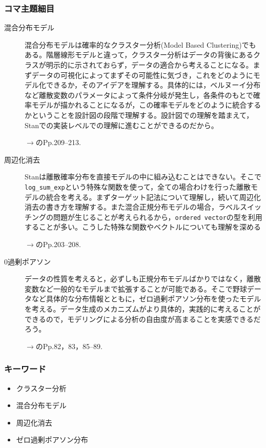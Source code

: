 \subsubsection{コマ主題細目}
\begin{description}
    \item[混合分布モデル] 混合分布モデルは確率的なクラスター分析(Model Based Clustering)でもある。階層線形モデルと違って，クラスター分析はデータの背後にあるクラスが明示的に示されておらず，データの適合から考えることになる。まずデータの可視化によってまずその可能性に気づき，これをどのようにモデル化できるか，そのアイデアを理解する。具体的には，ベルヌーイ分布など離散変数のパラメータによって条件分岐が発生し，各条件のもとで確率モデルが描かれることになるが，この確率モデルをどのように統合するかということを設計図の段階で理解する。設計図での理解を踏まえて，Stanでの実装レベルでの理解に進むことができるのだから。
    \begin{flushright}
        $\to$\citet{松浦201610}のPp.209--213.
    \end{flushright}

    \item[周辺化消去] Stanは離散確率分布を直接モデルの中に組み込むことはできない。そこで\verb|log_sum_exp|という特殊な関数を使って，全ての場合わけを行った離散モデルの統合を考える。まずターゲット記法について理解し，続いて周辺化消去の書き方を理解する。また混合正規分布モデルの場合，ラベルスイッチングの問題が生じることが考えられるから，\verb|ordered vector|の型を利用することが多い。こうした特殊な関数やベクトルについても理解を深める
    \begin{flushright}
        $\to$\citet{松浦201610}のPp.203--208.
    \end{flushright}
    \item[0過剰ポアソン] データの性質を考えると，必ずしも正規分布モデルばかりではなく，離散変数など一般的なモデルまで拡張することが可能である。そこで野球データなど具体的な分布情報とともに，ゼロ過剰ポアソン分布を使ったモデルを考える。データ生成のメカニズムがより具体的，実践的に考えることができるので，モデリングによる分析の自由度が高まることを実感できるだろう。
    \begin{flushright}
        $\to$\citet{松浦201610}のPp.82，83，85--89.
    \end{flushright} 
\end{description}
\subsubsection{キーワード}
\begin{itemize}
    \item クラスター分析
    \item 混合分布モデル
    \item 周辺化消去
    \item ゼロ過剰ポアソン分布
\end{itemize}
